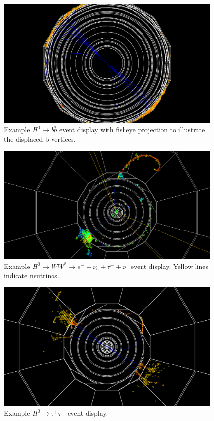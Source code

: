 \documentclass[a4paper]{article}
\begin{document}
\begin{figure}
	\includegraphics[width=\textwidth]{h-bbbar-vtex3}
	\caption{Example $H^0\rightarrow b\bar{b}$ event display with fisheye projection to illustrate the displaced b vertices.\label{fig:evt-disp-bbbar-fish}}
\end{figure}

\begin{figure}
	\includegraphics[width=\textwidth]{h-ww-e-tau-nunu}
	\caption{Example $H^0\rightarrow WW^*\rightarrow e^- + \bar{\nu_e} + \tau^+ + \nu_\tau$ event display. Yellow lines indicate neutrinos.\label{fig:evt-disp-ww-e-tau-nunu}}
\end{figure}

\begin{figure}
	\includegraphics[width=\textwidth]{h-tautau2}
	\caption{Example $H^0\rightarrow \tau^+\tau^-$ event display.\label{fig:evt-disp-tautau}}
\end{figure}

 


\end{document}
